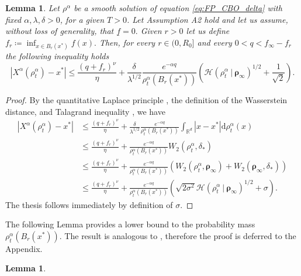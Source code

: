 \documentclass[reqno]{amsart}
\numberwithin{algorithm}{section}
\newcommand{\diff}{\mathrm{d}}
\newcommand{\Xalpha}{{X^\alpha}}
\newtheorem{lemma}[theorem]{Lemma}
\begin{document}
{\begin{lemma}\label{lemma:laplace2}
Let {$\rho^\alpha$ %
be a %
smooth solution of equation \eqref{eq:FP_CBO_delta}}  with fixed $\alpha,\lambda,\delta>0$, for a given $T>0$. Let Assumption A2 hold and let us assume, without loss of generality, that $\underline f = 0.$ Given $r>0$ let us define $f_r\coloneqq\inf_{x\in B_r(x^*)}f(x).$ Then, for every $r\in(0,R_0]$ and every $0<q<f_{\infty}-f_r$ the following inequality holds
    \begin{equation}
        |\Xalpha(\rho^\alpha_t) - x^*|\leq\frac{(q+ f_r)^\nu}{\eta} + \frac{\delta}{\lambda^{1/2}}\frac{e^{-\alpha q}}{\rho^\alpha_t(B_r(x^*))}\left(\mathcal H(\rho^\alpha_t\ |\ \boldsymbol\rho_\infty)^{1/2} + \frac{1}{\sqrt{2}}\right).
    \end{equation}
\end{lemma}
\begin{proof}
    By the quantitative Laplace principle \cite[Proposition 4.5]{B1-fornasier2021global}, the definition of the Wasserstein distance, and Talagrand inequality \cite{villani2009optimal}, we have
    \begin{equation}\begin{aligned}
        |\Xalpha(\rho^\alpha_t)-x^*|&\leq\frac{(q+ f_r)^\nu}{\eta} + \frac{\delta}{\lambda^{1/2}}\frac{e^{-\alpha q}}{\rho^\alpha_t(B_r(x^*))}\int_{\mathbb{R}^d} |x-x^*|\diff\rho^\alpha_t(x)\\
        &\leq\frac{(q+ f_r)^\nu}{\eta} + \frac{e^{-\alpha q}}{\rho^\alpha_t(B_r(x^*))}W_2(\rho^\alpha_t,\delta_*)\\
        & \leq\frac{(q+ f_r)^\nu}{\eta} + \frac{e^{-\alpha q}}{\rho^\alpha_t(B_r(x^*))}\left(W_2(\rho^\alpha_t,\boldsymbol\rho_\infty)+W_2(\boldsymbol\rho_\infty,\delta_*)\right)\\
        &\leq \frac{(q+ f_r)^\nu}{\eta} + \frac{e^{-\alpha q}}{\rho^\alpha_t(B_r(x^*))}\left(\sqrt{2\sigma^2}\mathcal H(\rho^\alpha_t\ | \ \boldsymbol\rho_\infty)^{1/2}+\sigma\right).
    \end{aligned}\end{equation}
    The thesis follows immediately by definition of $\sigma$.
\end{proof}
The following Lemma provides a lower bound to the probability mass $\rho^\alpha_t(B_r(x^*)).$ The result is analogous to \cite[Proposition 4.6]{B1-fornasier2021global}, therefore the proof is deferred to the Appendix.
\begin{lemma}\label{lemma:ball_measure}

\end{lemma}}
\end{document}
